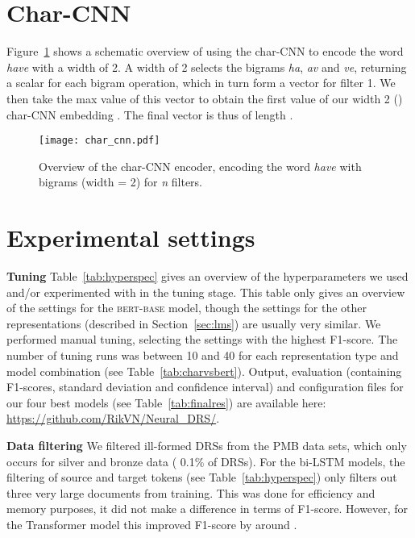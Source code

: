 \documentclass[11pt,a4paper]{article}
\newcommand{\bertbase}{\textsc{bert-base}}
\newcommand{\inlineheader}[1]{\vspace{0.06cm}
\noindent\textbf{#1}\quad
}
\begin{document}



\appendix

\section{Char-CNN}
\label{app:charcnn}

Figure~\ref{fig:charcnn} shows a schematic overview of using the char-CNN \citep{kim2016character} to encode the word \emph{have} with a width of 2.  A width of 2 selects the bigrams \emph{ha}, \emph{av} and \emph{ve}, returning a scalar for each bigram operation, which in turn form a vector  for filter 1. We then take the max value of this vector to obtain the first value of our width 2 () char-CNN embedding . The final vector  is thus of length .

\begin{figure}[!htb]
\texttt{[image: char\_cnn.pdf]}
  \caption{Overview of the char-CNN encoder, encoding the word \emph{have} with bigrams (width = 2) for \emph{n} filters.\label{fig:charcnn}}
\end{figure}

\section{Experimental settings}
\label{sec:hyperappendix}

\inlineheader{Tuning} Table~\ref{tab:hyperspec} gives an overview of the hyperparameters we used and/or experimented with in the tuning stage. This table only gives an overview of the settings for the \bertbase{} model, though the settings for the other representations (described in Section~\ref{sec:lms}) are usually very similar. We performed manual tuning, selecting the settings with the highest F1-score. The number of tuning runs was between 10 and 40 for each representation type and model combination (see Table~\ref{tab:charvsbert}). Output, evaluation (containing F1-scores, standard deviation and confidence interval) and configuration files for our four best models (see Table~\ref{tab:finalres}) are available here: \url{https://github.com/RikVN/Neural_DRS/}.

\inlineheader{Data filtering}We filtered ill-formed DRSs from the PMB data sets, which only occurs for silver and bronze data ( 0.1\% of DRSs). For the bi-LSTM models, the filtering of source and target tokens (see  Table~\ref{tab:hyperspec}) only filters out three very large documents from training. This was done for efficiency and memory purposes, it did not make a difference in terms of F1-score. However, for the Transformer model this improved F1-score by around .
\end{document}
